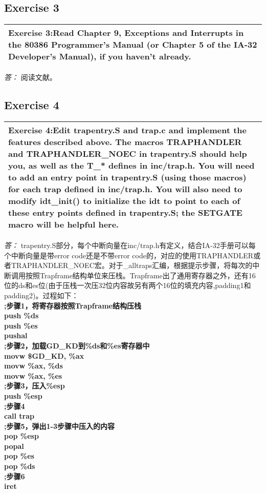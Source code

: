 \documentclass[11pt,a4paper]{article}
\newcommand{\exercise}[2]{
\begin{tabular}{|p{\textwidth}|}
\hline
Exercise #1:#2\\
\hline
\end{tabular}
\textit{\large{答：}}}
\begin{document}
\subsection{Exercise 3}
\exercise{3}{Read Chapter 9, Exceptions and Interrupts in the 80386 Programmer's Manual (or Chapter 5 of the  IA-32 Developer's Manual), if you haven't already.}
阅读文献。

\subsection{Exercise 4}
\exercise{4}{Edit trapentry.S and trap.c and implement the features described above. The macros TRAPHANDLER and TRAPHANDLER\_NOEC in trapentry.S should help you, as well as the T\_* defines in inc/trap.h. You will need to add an entry point in trapentry.S (using those macros) for each trap defined in inc/trap.h. You will also need to modify idt\_init() to initialize the idt to point to each of these entry points defined in trapentry.S; the SETGATE  macro will be helpful here.}
trapentry.S部分，每个中断向量在inc/trap.h有定义，结合IA-32手册可以每个中断向量是带error code还是不带error code的，对应的使用TRAPHANDLER或者TRAPHANDLER\_NOEC宏。对于\_alltraps汇编，根据提示步骤，将每次的中断调用按照Trapframe结构单位来压栈。Trapframe出了通用寄存器之外，还有16位的ds和es位(由于压栈一次压32位内容故另有两个16位的填充内容,padding1和padding2)。过程如下：\\
\textbf{
;步骤1，将寄存器按照Trapframe结构压栈\\
push \%ds \\
push \%es \\
pushal \\
;步骤2，加载GD\_KD到\%ds和\%es寄存器中\\
movw \$GD\_KD, \%ax \\
movw \%ax, \%ds \\
movw \%ax, \%es \\
;步骤3，压入\%esp\\
push \%esp \\
;步骤4\\
call trap \\
;步骤5，弹出1-3步骤中压入的内容\\
pop \%esp \\
popal \\
pop \%es \\
pop \%ds \\
;步骤6\\
iret\\}
\end{document}
